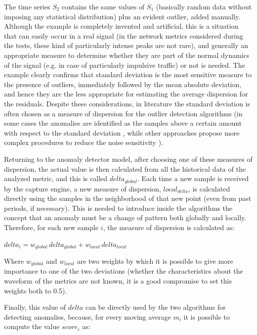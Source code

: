 \documentclass[12pt,a4paper,cucitura]{toptesi}
\begin{document}
The time series $S_2$ contains the same values of $S_1$ (basically random data without imposing any statistical distribution) plus an evident outlier, added manually. 
Although the example is completely invented and artificial, this is a situation that can easily occur in a real signal (in the network metrics considered during the tests, these kind of particularly intense peaks are not rare), and generally an appropriate measure to determine whether they are part of the normal dynamics of the signal (e.g. in case of particularly impulsive traffic) or not is needed.
The example clearly confirms that standard deviation is the most sensitive measure to the presence of outliers, immediately followed by the mean absolute deviation, and hence they are the less appropriate for estimating the average dispersion for the residuals.
Despite these considerations, in literature the standard deviation is often chosen as a measure of dispersion for the outlier detection algorithms (in some cases the anomalies are identified as the samples above a certain amount with respect to the standard deviation \cite{stddev1}, while other approaches propose more complex procedures to reduce the noise sensitivity \cite{stddev2}).


Returning to the anomaly detector model, after choosing one of these measures of dispersion, the actual value is then calculated from all the historical data of the analyzed metric, and this is called $delta_{global}$.
Each time a new sample is received by the capture engine, a new measure of dispersion, $local_{delta}$, is calculated directly using the samples in the neighborhood of that new point (even from past periods, if necessary).
This is needed to introduce inside the algorithms the concept that an anomaly must be a change of pattern both globally and locally. Therefore, for each new sample $i$, the measure of dispersion is calculated as:

\begin{center}
\Large
$delta_i = w_{global}\,delta_{global} + w_{local}\,delta_{local}$
\end{center}

Where $w_{global}$ and $w_{local}$ are two weights by which it is possible to give more importance to one of the two deviations (whether the characteristics about the waveform of the metrics are not known, it is a good compromise to set this weights both to 0.5).

Finally, this value of $delta$ can be directly used by the two algorithms for detecting anomalies, because, for every moving average $m_i$ it is possible to compute the value $score_i$ as:
\end{document}
